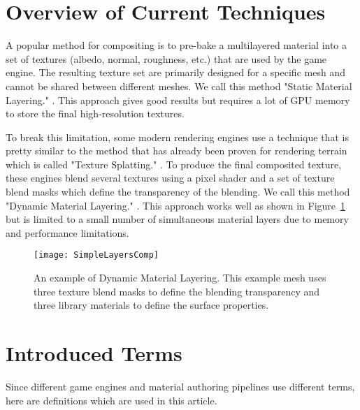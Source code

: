 \section{Overview of Current Techniques}

A popular method for compositing is to pre-bake a multilayered material into a set of textures (albedo, normal, roughness, etc.) that are used by the game engine.
The resulting texture set are primarily designed for a specific mesh and cannot be shared between different meshes.
We call this method "Static Material Layering."
\cite{MaterialsOrder1886,TexturingU4}.
This approach gives good results but requires a lot of GPU memory to store the final high-resolution textures.


To break this limitation, some modern rendering engines use a technique that is pretty similar to the method that has already been proven for rendering terrain which is called "Texture Splatting."
\cite{TexSplatting}.
To produce the final composited texture, these engines blend several textures using a pixel shader and a set of texture blend masks which define the transparency of the blending.
We call this method "Dynamic Material Layering."
\cite{LayeredMaterialUE4,LayeredMaterialSubstance}.
This approach works well as shown in Figure~\ref{Makeev-DynamicMaterialLayering} but is limited to a small number of simultaneous material layers due to memory and performance limitations.

\begin{figure}\centering
\texttt{[image: SimpleLayersComp]}
\caption{
An example of Dynamic Material Layering.
This example mesh uses three texture blend masks to define the blending transparency and three library materials to define the surface properties.
}
\label{Makeev-DynamicMaterialLayering}
\end{figure}

\section{Introduced Terms}

Since different game engines and material authoring pipelines use different terms, here are definitions which are used in this article.


